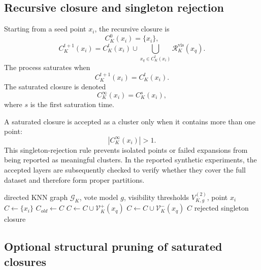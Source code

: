 \documentclass[pdflatex,sn-mathphys-num]{sn-jnl}
\newcommand{\calG}{\mathcal{G}}
\newcommand{\calR}{\mathcal{R}}
\newcommand{\calV}{\mathcal{V}}
\begin{document}
\subsection{Recursive closure and singleton rejection}

Starting from a seed point $x_i$, the recursive closure is
\begin{equation}
C_K^0(x_i)=\{x_i\},
\end{equation}
\begin{equation}
C_K^{t+1}(x_i)=C_K^t(x_i)\cup
\bigcup_{x_q\in C_K^t(x_i)}\calR_K^{\mathrm{vis}}(x_q).
\label{eq:visibility_closure}
\end{equation}
The process saturates when
\begin{equation}
C_K^{t+1}(x_i)=C_K^t(x_i).
\end{equation}
The saturated closure is denoted
\begin{equation}
C_K^\infty(x_i)=C_K^s(x_i),
\end{equation}
where $s$ is the first saturation time.

A saturated closure is accepted as a cluster only when it contains more than one point:
\begin{equation}
|C_K^\infty(x_i)|>1.
\label{eq:singleton_rejection}
\end{equation}
This singleton-rejection rule prevents isolated points or failed expansions from being reported as meaningful clusters. In the reported synthetic experiments, the accepted layers are subsequently checked to verify whether they cover the full dataset and therefore form proper partitions.

\begin{algorithm}[t]
\caption{Visibility-filtered round-trip closure for one point}
\label{alg:visibility_closure}
\begin{algorithmic}[1]
\Require directed KNN graph $\calG_K$, vote model $g$, visibility thresholds $V_{K,g}^{(2)}$, point $x_i$
\State $C \gets \{x_i\}$
\Repeat
    \State $C_{old}\gets C$
        \State $C\gets C\cup\calV_K^+(x_q)$
        \State $C\gets C\cup\calV_K^-(x_q)$
    \EndFor
{}
    \State \Return $C$
\Else
    \State \Return rejected singleton closure
\EndIf
\end{algorithmic}
\end{algorithm}

\subsection{Optional structural pruning of saturated closures}
\label{sec:structural_pruning}
\end{document}
